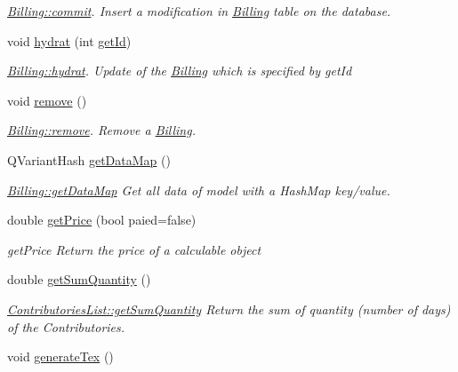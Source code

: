 \begin{DoxyCompactItemize}
\begin{DoxyCompactList}\small\item\em \hyperlink{classModels_1_1Billing_ad2280a0d8dde4c36e88c344b01044caf}{Billing\+::commit}. Insert a modification in \hyperlink{classModels_1_1Billing}{Billing} table on the database. \end{DoxyCompactList}\item 
void \hyperlink{classModels_1_1Billing_a689643008955fdcd5833631a6202c0dc}{hydrat} (int \hyperlink{classModels_1_1IModel_a63087bb34da8c38a11109cd775122d31}{get\+Id})
\begin{DoxyCompactList}\small\item\em \hyperlink{classModels_1_1Billing_a689643008955fdcd5833631a6202c0dc}{Billing\+::hydrat}. Update of the \hyperlink{classModels_1_1Billing}{Billing} which is specified by {\itshape get\+Id} \end{DoxyCompactList}\item 
\hypertarget{classModels_1_1Billing_ada8a7c127a80fa7349fbd6a7d30ca4a3}{}void \hyperlink{classModels_1_1Billing_ada8a7c127a80fa7349fbd6a7d30ca4a3}{remove} ()\label{classModels_1_1Billing_ada8a7c127a80fa7349fbd6a7d30ca4a3}

\begin{DoxyCompactList}\small\item\em \hyperlink{classModels_1_1Billing_ada8a7c127a80fa7349fbd6a7d30ca4a3}{Billing\+::remove}. Remove a \hyperlink{classModels_1_1Billing}{Billing}. \end{DoxyCompactList}\item 
Q\+Variant\+Hash \hyperlink{classModels_1_1Billing_a2363c0b978434c0a835f894a67eb81e1}{get\+Data\+Map} ()
\begin{DoxyCompactList}\small\item\em \hyperlink{classModels_1_1Billing_a2363c0b978434c0a835f894a67eb81e1}{Billing\+::get\+Data\+Map} Get all data of model with a Hash\+Map key/value. \end{DoxyCompactList}\item 
double \hyperlink{classModels_1_1Billing_a866e81394fa11dce7dc4ab7bfc53ed79}{get\+Price} (bool paied=false)
\begin{DoxyCompactList}\small\item\em get\+Price Return the price of a calculable object \end{DoxyCompactList}\item 
double \hyperlink{classModels_1_1Billing_a360006189d4867e3281009b0c465bc53}{get\+Sum\+Quantity} ()
\begin{DoxyCompactList}\small\item\em \hyperlink{classModels_1_1ContributoriesList_af9b3b1b703cebeef552d058999ffcc4c}{Contributories\+List\+::get\+Sum\+Quantity} Return the sum of quantity (number of days) of the Contributories. \end{DoxyCompactList}\item 
\hypertarget{classModels_1_1Billing_a3f835c6f4ea0b66c43bb7fec40c6e075}{}void \hyperlink{classModels_1_1Billing_a3f835c6f4ea0b66c43bb7fec40c6e075}{generate\+Tex} ()\label{classModels_1_1Billing_a3f835c6f4ea0b66c43bb7fec40c6e075}


\end{DoxyCompactItemize}
